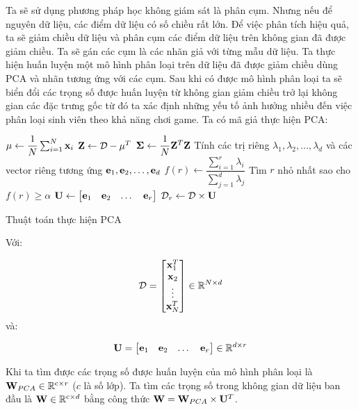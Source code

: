 Ta sẽ sử dụng phương pháp học không giám sát là phân cụm.
        Nhưng nếu để nguyên dữ liệu, các điểm dữ liệu có số chiều rất lớn.
        Để việc phân tích hiệu quả, ta sẽ giảm chiều dữ liệu và phân cụm các điểm dữ liệu trên không gian đã được giảm chiều.
        Ta sẽ gán các cụm là các nhãn giả với từng mẫu dữ liệu.
        Ta thực hiện huấn luyện một mô hình phân loại trên dữ liệu đã được giảm chiều dùng PCA và nhãn tương ứng với các cụm.
        Sau khi có được mô hình phân loại ta sẽ biển đổi các trọng số được huấn luyện từ không gian giảm chiều trở lại không gian các đặc trưng gốc từ đó ta xác định những yếu tố ảnh hưởng nhiều đến việc phân loại sinh viên theo khả năng chơi game.
        Ta có mã giả thực hiện PCA:

        \begin{algorithm}[h!]
            \DontPrintSemicolon

            $\bold{\mu} \gets \dfrac{1}{N} \sum_{i=1}^N \bold{x}_i$\;
            $\bold{Z} \gets \mathcal{D} - \bold{\mu}^T$\;
            $\bold{\Sigma} \gets \dfrac{1}{N}\bold{Z}^T \bold{Z}$\;
            Tính các trị riêng $\lambda_1, \lambda_2, \dots, \lambda_d$ và các vector riêng tương ứng $\bold{e}_1, \bold{e}_2, \dots, \bold{e}_d$\;
            $f(r) \gets \dfrac{\sum_{i=1}^r \lambda_i}{\sum_{j=1}^d \lambda_j}$\;
            Tìm $r$ nhỏ nhất sao cho $f(r) \geq \alpha$\;
            $\bold{U} \gets \begin{bmatrix} \bold{e}_1  & \bold{e}_2  & \dots  & \bold{e}_r \end{bmatrix}$\;
            $\mathcal{D}_r \gets \mathcal{D} \times \bold{U}$\;
            \;
            \caption{Thuật toán thực hiện PCA}
            \label{alg:PCA}
        \end{algorithm}

        Với:

        \begin{equation*}
            \mathcal{D} = \begin{bmatrix}
                \bold{x}_1^T \\ \bold{x}_2 \\ \vdots \\ \bold{x}_N^T
            \end{bmatrix} \in \mathbb{R}^{N \times d}
        \end{equation*}
        và:

        \begin{equation*}
            \bold{U} = \begin{bmatrix}
                \bold{e}_1 & \bold{e}_2 & \dots & \bold{e}_r
            \end{bmatrix} \in \mathbb{R}^{d \times r}
        \end{equation*}

        Khi ta tìm được các trọng số được huấn luyện của mô hình phân loại là $\bold{W}_{PCA} \in \mathbb{R}^{\mathrm{c} \times r}$ ($c$ là số lớp).
        Ta tìm các trọng số trong không gian dữ liệu ban đầu là $\bold{W} \in \mathbb{R}^{\mathrm{c} \times d}$ bằng công thức $\bold{W} =   \bold{W}_{PCA} \times \bold{U}^T$.